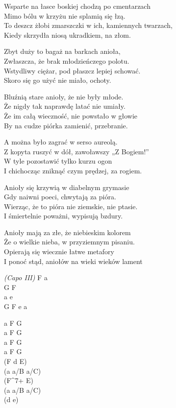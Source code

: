 \begin{text}
    \small{
    \hfill\break
Wsparte na łasce boskiej chodzą po cmentarzach\\
Mimo bólu w krzyżu nie splamią się łzą.\\
To deszcz żłobi zmarszczki w ich, kamiennych twarzach,\\
Kiedy skrzydła niosą ukradkiem, na złom.

Zbyt duży to bagaż na barkach anioła,\\
Zwłaszcza, że brak młodzieńczego polotu.\\
Wstydliwy ciężar, pod płaszcz lepiej schować.\\
Skoro się go użyć nie miało, ochoty.

Bluźnią stare anioły, że nie były młode.\\
Że nigdy tak naprawdę latać nie umiały.\\
Że im całą wieczność, nie powstało w głowie\\
By na cudze piórka zamienić, przebranie.

A można było zagrać w serso aureolą.\\
Z kopyta ruszyć w dół, zawoławszy „Z Bogiem!”\\
W tyle pozostawić tylko kurzu ogon\\
I chichocząc zniknąć czym prędzej, za rogiem.

Anioły się krzywią w diabelnym grymasie\\
Gdy naiwni poeci, chwytają za pióra.\\
Wierząc, że to pióra nie ziemskie, nie ptasie.\\
I śmiertelnie poważni, wypisują bzdury.

Anioły mają za złe, że niebieskim kolorem\\
Że o wielkie nieba, w przyziemnym pisaniu.\\
Opierają się wiecznie łatwe metafory\\
I ponoć stąd, aniołów na wieki wieków lament
    }
\end{text}
\begin{chord}
    \small{
    \textit{(Capo III)}
    F a\\
    G F\\
    a e\\
    G F e a

    a F G\\
    a F G\\
    a F G\\
    a F G\\
    (F d E)\\
    (a a/B a/C)\\
    (F^{7+} E)\\
    (a a/B a/C)\\
    (d e)
    }
\end{chord}